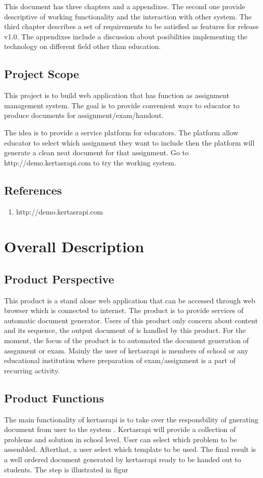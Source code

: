\documentclass{scrreprt}
\begin{document}
This document has three chapters and a appendixes. The second one provide descriptive of working functionality and the interaction with other system. The third chapter describes a set of requirements to be satisfied as features for release v1.0. The appendixes include a discussion about posibilities implementing the technology on different field other than education.  

\section{Project Scope}
This project is to build web application that has function as assignment management system. The goal is to provide convenient ways to educator to produce documents for assignment/exam/handout. 

The idea is to provide a service platform for educators. The platform allow educator to select which assignment they want to include then the platform will generate a clean neat document for that assignment. Go to http://demo.kertasrapi.com to try the working system.

\section{References}
\begin{enumerate}
    \item http://demo.kertasrapi.com
\end{enumerate}

\chapter{Overall Description}

\section{Product Perspective}
This product is a stand alone web application that can be accessed through web browser which is connected to internet. The product is to provide services of automatic document generator. Users of this product only concern about content and its sequence, the output document of is handled by this product. For the moment, the focus of the product is to automated the document generation of assgnment or exam. Mainly the user of kertasrapi is members of school or any educational institution where preparation of exam/assignment is a part of recurring activity.    

\section{Product Functions}
The main functionality of kertasrapi is to take over the responsbility of gnerating document from user to the system . Kertasrapi will provide a collection of problems and solution in school level. User can select which problem to be assembled. Afterthat, a user select which template to be used. The final result is a well ordered document generated by kertasrapi ready to be handed out to students. The step is illustrated in figur
\end{document}
